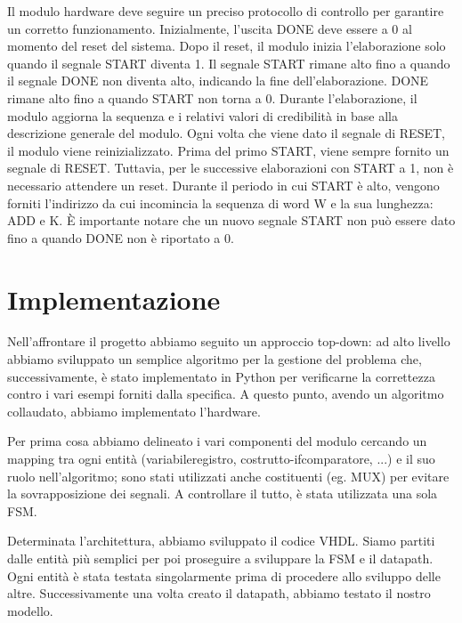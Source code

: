 \documentclass[a4paper]{article}
\begin{document}
Il modulo hardware deve seguire un preciso protocollo di controllo per garantire un corretto funzionamento. Inizialmente, l'uscita DONE deve essere a 0 al momento del reset del sistema. Dopo il reset, il modulo inizia l'elaborazione solo quando il segnale START diventa 1. Il segnale START rimane alto fino a quando il segnale DONE non diventa alto, indicando la fine dell'elaborazione. DONE rimane alto fino a quando START non torna a 0. Durante l'elaborazione, il modulo aggiorna la sequenza e i relativi valori di credibilità in base alla descrizione generale del modulo. Ogni volta che viene dato il segnale di RESET, il modulo viene reinizializzato. Prima del primo START, viene sempre fornito un segnale di RESET. Tuttavia, per le successive elaborazioni con START a 1, non è necessario attendere un reset. Durante il periodo in cui START è alto, vengono forniti l'indirizzo da cui incomincia la sequenza di word W e la sua lunghezza: ADD e K. È importante notare che un nuovo segnale START non può essere dato fino a quando DONE non è riportato a 0.

\section{Implementazione}
Nell'affrontare il progetto abbiamo seguito un approccio top-down: ad alto livello abbiamo sviluppato un semplice algoritmo per la gestione del problema che, successivamente, è stato implementato in Python per verificarne la correttezza contro i vari esempi forniti dalla specifica. A questo punto, avendo un algoritmo collaudato, abbiamo implementato l'hardware.

Per prima cosa abbiamo delineato i vari componenti del modulo cercando un mapping tra ogni entità (variabile\textrightarrow registro, costrutto-if\textrightarrow comparatore, ...) e il suo ruolo nell'algoritmo; sono stati utilizzati anche costituenti (eg. MUX) per evitare la sovrapposizione dei segnali. A controllare il tutto, è stata utilizzata una sola FSM.

Determinata l'architettura, abbiamo sviluppato il codice VHDL. Siamo partiti dalle entità più semplici per poi proseguire a sviluppare la FSM e il datapath. Ogni entità è stata testata singolarmente prima di procedere allo sviluppo delle altre. Successivamente una volta creato il datapath, abbiamo testato il nostro modello.
\end{document}
